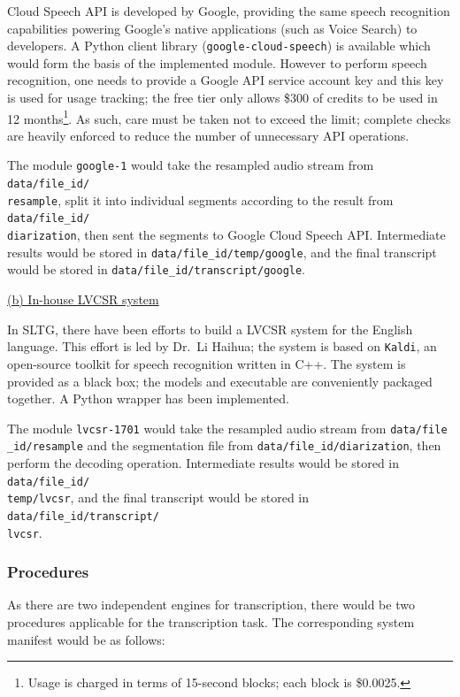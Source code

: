 Cloud Speech API is developed by Google, providing the same speech recognition capabilities powering Google's native applications (such as Voice Search) to developers. A Python client library (\texttt{google-cloud-speech}) is available which would form the basis of the implemented module. However to perform speech recognition, one needs to provide a Google API service account key and this key is used for usage tracking; the free tier only allows \$300 of credits to be used in 12 months\footnote{Usage is charged in terms of 15-second blocks; each block is \$0.0025.}. As such, care must be taken not to exceed the limit; complete checks are heavily enforced to reduce the number of unnecessary API operations.

The module \texttt{google-1} would take the resampled audio stream from \texttt{data/file\_id/\\ resample}, split it into individual segments according to the result from \texttt{data/file\_id/\\diarization}, then sent the segments to Google Cloud Speech API\@. Intermediate results would be stored in \texttt{data/file\_id/temp/google}, and the final transcript would be stored in \texttt{data/file\_id/transcript/google}.

\underline{(b) In-house LVCSR system}

In SLTG, there have been efforts to build a LVCSR system for the English language. This effort is led by Dr.\ Li Haihua; the system is based on \texttt{Kaldi}, an open-source toolkit for speech recognition written in C++. The system is provided as a black box; the models and executable are conveniently packaged together. A Python wrapper has been implemented.

The module \texttt{lvcsr-1701} would take the resampled audio stream from \texttt{data/file\\ \_id/resample} and the segmentation file from \texttt{data/file\_id/diarization}, then perform the decoding operation. Intermediate results would be stored in \texttt{data/file\_id/\\ temp/lvcsr}, and the final transcript would be stored in \texttt{data/file\_id/transcript/\\lvcsr}.

\subsubsection{Procedures}

As there are two independent engines for transcription, there would be two procedures applicable for the transcription task. The corresponding system manifest would be as follows:

